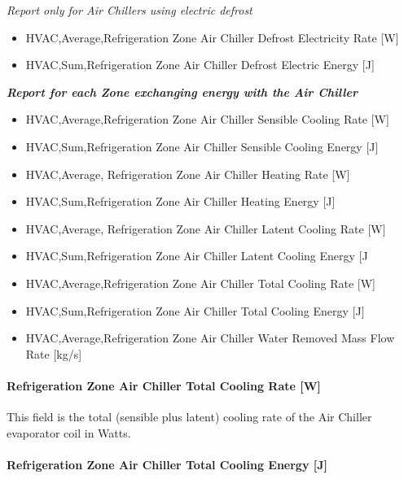 \emph{Report only for Air Chillers using electric defrost}

\begin{itemize}
\item
  HVAC,Average,Refrigeration Zone Air Chiller Defrost Electricity Rate {[}W{]}
\item
  HVAC,Sum,Refrigeration Zone Air Chiller Defrost Electric Energy {[}J{]}
\end{itemize}

\textbf{\emph{Report for each Zone exchanging energy with the Air Chiller}}

\begin{itemize}
\item
  HVAC,Average,Refrigeration Zone Air Chiller Sensible Cooling Rate {[}W{]}
\item
  HVAC,Sum,Refrigeration Zone Air Chiller Sensible Cooling Energy {[}J{]}
\item
  HVAC,Average, Refrigeration Zone Air Chiller Heating Rate {[}W{]}
\item
  HVAC,Sum,Refrigeration Zone Air Chiller Heating Energy {[}J{]}
\item
  HVAC,Average, Refrigeration Zone Air Chiller Latent Cooling Rate {[}W{]}
\item
  HVAC,Sum,Refrigeration Zone Air Chiller Latent Cooling Energy {[}J
\item
  HVAC,Average,Refrigeration Zone Air Chiller Total Cooling Rate {[}W{]}
\item
  HVAC,Sum,Refrigeration Zone Air Chiller Total Cooling Energy {[}J{]}
\item
  HVAC,Average,Refrigeration Zone Air Chiller Water Removed Mass Flow Rate {[}kg/s{]}
\end{itemize}

\paragraph{Refrigeration Zone Air Chiller Total Cooling Rate {[}W{]}}\label{refrigeration-zone-air-chiller-total-cooling-rate-w-1}

This field is the total (sensible plus latent) cooling rate of the Air Chiller evaporator coil in Watts.

\paragraph{Refrigeration Zone Air Chiller Total Cooling Energy {[}J{]}}\label{refrigeration-zone-air-chiller-total-cooling-energy-j}

